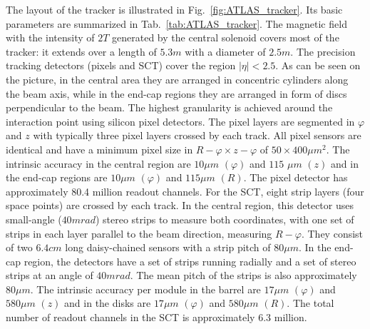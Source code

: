The layout of the tracker is illustrated in Fig.~\ref{fig:ATLAS_tracker}. Its
basic parameters are summarized in Tab.~\ref{tab:ATLAS_tracker}. The magnetic field with the intensity of $2T$ generated by the central solenoid covers most of the tracker: it extends over a length of $5.3 m$ with a diameter of $2.5 m$. The precision tracking detectors (pixels and SCT) cover the region
$|\eta|<2.5$. As can be seen on the picture, in the central area they are arranged in concentric cylinders along the beam axis, while in the end-cap regions they are arranged in form of discs perpendicular to the beam. The highest granularity is achieved around the interaction point using silicon pixel detectors. The pixel layers are
segmented in $\varphi$ and $z$ with typically three pixel layers crossed by each track. All pixel sensors
are identical and have a minimum pixel size in $R-\varphi \times z-\varphi$ of $50 \times 400 \mu m^2$. The intrinsic accuracy
in the central region are $10 \mu m$ $(\varphi)$ and $115$ $\mu m$ $(z)$ and in the end-cap regions are $10 \mu m$ $(\varphi)$ and $115 \mu m$ $(R)$.
The pixel detector has approximately 80.4 million readout channels. For the SCT, eight strip layers
(four space points) are crossed by each track. In the central region, this detector uses small-angle
($40 mrad$) stereo strips to measure both coordinates, with one set of strips in each layer parallel to
the beam direction, measuring $R-\varphi$. They consist of two $6.4 cm$ long daisy-chained sensors with
a strip pitch of $80 \mu m$. In the end-cap region, the detectors have a set of strips running radially and
a set of stereo strips at an angle of $40 mrad$. The mean pitch of the strips is also approximately
$80 \mu m$. The intrinsic accuracy per module in the barrel are $17 \mu m$ $(\varphi)$ and $580 \mu m$ $(z)$ and in
the disks are $17 \mu m$ $(\varphi)$ and $580 \mu m$ $(R)$. The total number of readout channels in the SCT is
approximately 6.3 million.


